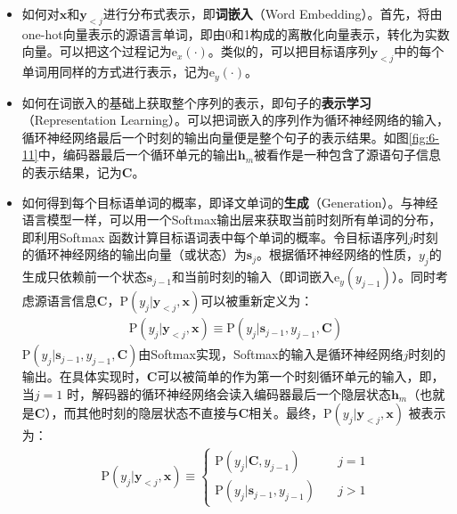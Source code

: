 \vspace{-0.5em}
\begin{itemize}
\vspace{0.5em}
\item	如何对$\mathbf{x}$和$\mathbf{y}_{<j }$进行分布式表示，即{\small\sffamily\bfseries{词嵌入}}（Word Embedding）。首先，将由one-hot向量表示的源语言单词，即由0和1构成的离散化向量表示，转化为实数向量。可以把这个过程记为$\textrm{e}_x (\cdot)$。类似的，可以把目标语序列$\mathbf{y}_{<j }$中的每个单词用同样的方式进行表示，记为$\textrm{e}_y (\cdot)$。
\vspace{0.5em}
\item	如何在词嵌入的基础上获取整个序列的表示，即句子的{\small\sffamily\bfseries{表示学习}}（Representation Learning）。可以把词嵌入的序列作为循环神经网络的输入，循环神经网络最后一个时刻的输出向量便是整个句子的表示结果。如图\ref{fig:6-11}中，编码器最后一个循环单元的输出$\mathbf{h}_m$被看作是一种包含了源语句子信息的表示结果，记为$\mathbf{C}$。
\vspace{0.5em}
\item	如何得到每个目标语单词的概率，即译文单词的{\small\sffamily\bfseries{生成}}（Generation）。与神经语言模型一样，可以用一个Softmax输出层来获取当前时刻所有单词的分布，即利用Softmax 函数计算目标语词表中每个单词的概率。令目标语序列$j$时刻的循环神经网络的输出向量（或状态）为$\mathbf{s}_j$。根据循环神经网络的性质，$ y_j$的生成只依赖前一个状态$\mathbf{s}_{j-1}$和当前时刻的输入（即词嵌入$\textrm{e}_y (y_{j-1})$）。同时考虑源语言信息$\mathbf{C}$，$\textrm{P}(y_j  | \mathbf{y}_{<j},\mathbf{x})$可以被重新定义为：
\begin{eqnarray}
\textrm{P} (y_j | \mathbf{y}_{<j},\mathbf{x}) \equiv \textrm{P} ( {y_j | \mathbf{s}_{j-1} ,y_{j-1},\mathbf{C}} )
\label{eq:6-4}
\end{eqnarray}
$\textrm{P}({y_j | \mathbf{s}_{j-1} ,y_{j-1},\mathbf{C}})$由Softmax实现，Softmax的输入是循环神经网络$j$时刻的输出。在具体实现时，$\mathbf{C}$可以被简单的作为第一个时刻循环单元的输入，即，当$j=1$ 时，解码器的循环神经网络会读入编码器最后一个隐层状态$ \mathbf{h}_m$（也就是$\mathbf{C}$），而其他时刻的隐层状态不直接与$\mathbf{C}$相关。最终，$\textrm{P} (y_j | \mathbf{y}_{<j},\mathbf{x})$ 被表示为：
\begin{eqnarray}
\textrm{P} (y_j | \mathbf{y}_{<j},\mathbf{x}) \equiv
 \left \{ \begin{array}{ll}
\textrm{P} (y_j |\mathbf{C} ,y_{j-1}) &j=1 \\
\textrm{P} (y_j|\mathbf{s}_{j-1},y_{j-1})  \quad &j>1
\end{array} \right .
\label{eq:6-5}
\end{eqnarray}
\vspace{0.5em}
\end{itemize}


